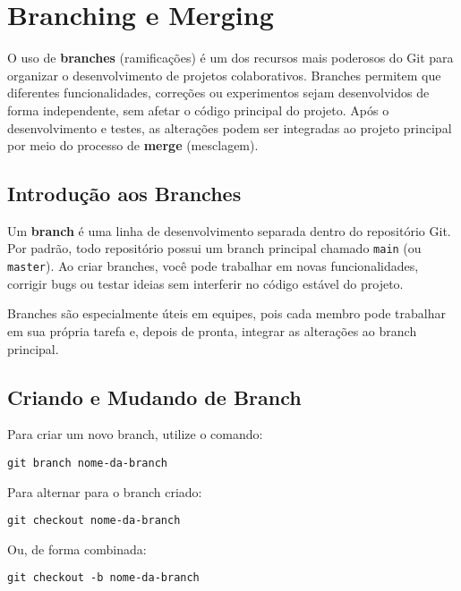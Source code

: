 \newpage
\section{Branching e Merging}

O uso de \textbf{branches} (ramificações) é um dos recursos mais poderosos do Git para organizar o desenvolvimento de projetos colaborativos. Branches permitem que diferentes funcionalidades, correções ou experimentos sejam desenvolvidos de forma independente, sem afetar o código principal do projeto. Após o desenvolvimento e testes, as alterações podem ser integradas ao projeto principal por meio do processo de \textbf{merge} (mesclagem).

\subsection{Introdução aos Branches}

Um \textbf{branch} é uma linha de desenvolvimento separada dentro do repositório Git. Por padrão, todo repositório possui um branch principal chamado \texttt{main} (ou \texttt{master}). Ao criar branches, você pode trabalhar em novas funcionalidades, corrigir bugs ou testar ideias sem interferir no código estável do projeto.

Branches são especialmente úteis em equipes, pois cada membro pode trabalhar em sua própria tarefa e, depois de pronta, integrar as alterações ao branch principal.

\subsection{Criando e Mudando de Branch}

Para criar um novo branch, utilize o comando:

\begin{lstlisting}[style=shellstyle]
git branch nome-da-branch
\end{lstlisting}

Para alternar para o branch criado:

\begin{lstlisting}[style=shellstyle]
git checkout nome-da-branch
\end{lstlisting}

Ou, de forma combinada:

\begin{lstlisting}[style=shellstyle]
git checkout -b nome-da-branch
\end{lstlisting}

